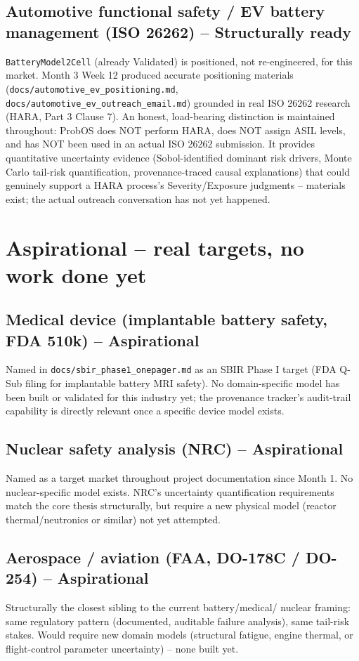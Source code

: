 \documentclass[11pt]{article}
\begin{document}
\subsection*{Automotive functional safety / EV battery management (ISO 26262) -- Structurally ready}
\texttt{BatteryModel2Cell} (already Validated) is positioned, not
re-engineered, for this market. Month 3 Week 12 produced accurate
positioning materials
(\texttt{docs/automotive\_ev\_positioning.md},
\texttt{docs/automotive\_ev\_outreach\_email.md}) grounded in real
ISO 26262 research (HARA, Part 3 Clause 7). An honest, load-bearing
distinction is maintained throughout: ProbOS does NOT perform HARA,
does NOT assign ASIL levels, and has NOT been used in an actual
ISO 26262 submission. It provides quantitative uncertainty evidence
(Sobol-identified dominant risk drivers, Monte Carlo tail-risk
quantification, provenance-traced causal explanations) that could
genuinely support a HARA process's Severity/Exposure judgments --
materials exist; the actual outreach conversation has not yet
happened.

\section*{Aspirational -- real targets, no work done yet}

\subsection*{Medical device (implantable battery safety, FDA 510k) -- Aspirational}
Named in \texttt{docs/sbir\_phase1\_onepager.md} as an SBIR Phase I
target (FDA Q-Sub filing for implantable battery MRI safety). No
domain-specific model has been built or validated for this industry
yet; the provenance tracker's audit-trail capability is directly
relevant once a specific device model exists.

\subsection*{Nuclear safety analysis (NRC) -- Aspirational}
Named as a target market throughout project documentation since Month
1. No nuclear-specific model exists. NRC's uncertainty quantification
requirements match the core thesis structurally, but require a new
physical model (reactor thermal/neutronics or similar) not yet
attempted.

\subsection*{Aerospace / aviation (FAA, DO-178C / DO-254) -- Aspirational}
Structurally the closest sibling to the current battery/medical/
nuclear framing: same regulatory pattern (documented, auditable
failure analysis), same tail-risk stakes. Would require new
domain models (structural fatigue, engine thermal, or flight-control
parameter uncertainty) -- none built yet.
\end{document}
